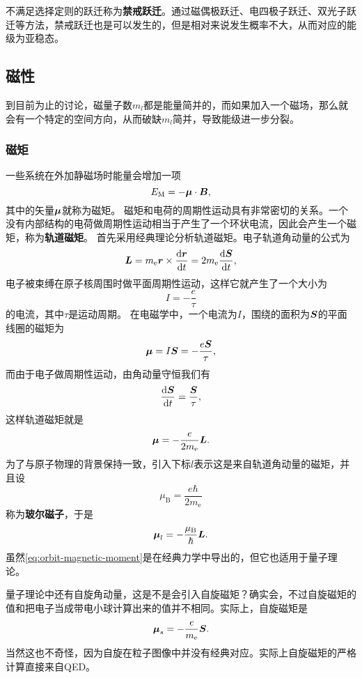 \documentclass[UTF8, a4paper]{ctexart}
\begin{document}
不满足选择定则的跃迁称为\textbf{禁戒跃迁}。通过磁偶极跃迁、电四极子跃迁、双光子跃迁等方法，禁戒跃迁也是可以发生的，但是相对来说发生概率不大，从而对应的能级为亚稳态。

\subsection{磁性}

到目前为止的讨论，磁量子数$m_l$都是能量简并的，而如果加入一个磁场，那么就会有一个特定的空间方向，从而破缺$m_l$简并，导致能级进一步分裂。

\subsubsection{磁矩}

一些系统在外加静磁场时能量会增加一项
\[
    E_\text{M} = - \vb*{\mu} \cdot \vb*{B},
\]
其中的矢量$\vb*{\mu}$就称为磁矩。
磁矩和电荷的周期性运动具有非常密切的关系。一个没有内部结构的电荷做周期性运动相当于产生了一个环状电流，因此会产生一个磁矩，称为\textbf{轨道磁矩}。
首先采用经典理论分析轨道磁矩。电子轨道角动量的公式为
\[
    \vb*{L} = m_\text{e} \vb*{r} \times \dv{\vb*{r}}{t} = 2 m_\text{e} \dv{\vb*{S}}{t},
\]
电子被束缚在原子核周围时做平面周期性运动，这样它就产生了一个大小为
\[
    I = - \frac{e}{\tau}
\]
的电流，其中$\tau$是运动周期。
在电磁学中，一个电流为$I$，围绕的面积为$\vb*{S}$的平面线圈的磁矩为
\[
    \vb*{\mu} = I \vb*{S} = - \frac{e \vb*{S}}{\tau},
\]
而由于电子做周期性运动，由角动量守恒我们有
\[
    \dv{\vb*{S}}{t} = \frac{\vb*{S}}{\tau},
\]
这样轨道磁矩就是
\[
    \vb*{\mu} = - \frac{e}{2m_\text{e}} \vb*{L}.
\]
为了与原子物理的背景保持一致，引入下标$l$表示这是来自轨道角动量的磁矩，并且设
\begin{equation}
    \mu_\text{B} = \frac{e\hbar}{2m_\text{e}}
\end{equation}
称为\textbf{玻尔磁子}，于是
\begin{equation}
    \vb*{\mu}_l = - \frac{\mu_\text{B}}{\hbar} \vb*{L}.
    \label{eq:orbit-magnetic-moment}
\end{equation}
虽然\eqref{eq:orbit-magnetic-moment}是在经典力学中导出的，但它也适用于量子理论。

量子理论中还有自旋角动量，这是不是会引入自旋磁矩？确实会，不过自旋磁矩的值和把电子当成带电小球计算出来的值并不相同。实际上，自旋磁矩是
\begin{equation}
    \vb*{\mu}_s = - \frac{e}{m_\text{e}} \vb*{S}.
\end{equation}
当然这也不奇怪，因为自旋在粒子图像中并没有经典对应。实际上自旋磁矩的严格计算直接来自QED。
\end{document}

